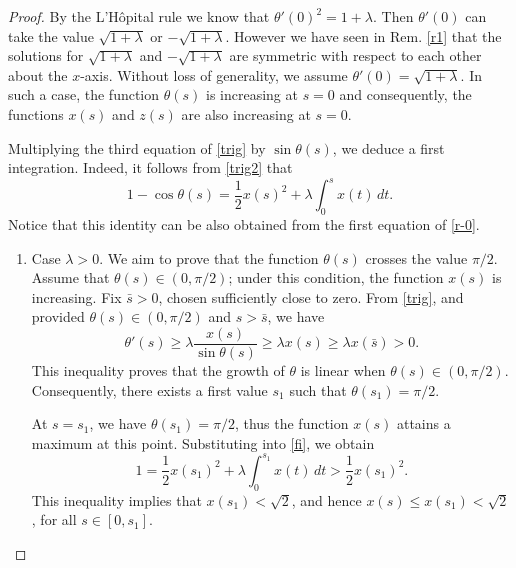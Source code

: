 \documentclass[12pt]{amsart}
\theoremstyle{definition}
\begin{document}
\begin{proof}
 

 By the L'H\^{o}pital rule we know that $\theta'(0)^2=1+\lambda$.  Then $\theta'(0)$ can take the value $\sqrt{1+\lambda}$ or $-\sqrt{1+\lambda}$. However we have seen in  Rem. \ref{r1} that the solutions for $\sqrt{1+\lambda}$ and $-\sqrt{1+\lambda}$ are symmetric with respect to each other about the $x$-axis.  Without loss of generality, we assume     $\theta'(0)=\sqrt{1+\lambda}$.  In such a case, the function $\theta(s)$ is increasing at $s=0$ and consequently, the functions $x(s)$ and $z(s)$ are also increasing at $s=0$.   

Multiplying the third equation of \eqref{trig} by $\sin\theta(s)$, we deduce a first integration. Indeed, it follows from \eqref{trig2} that
 \begin{equation}\label{fi}
1 -\cos\theta(s)=\frac12x(s)^2+\lambda\int_0^sx(t)\, dt.
\end{equation}
Notice that this identity can be also obtained from the first equation of \eqref{r-0}. 
\begin{enumerate}
\item Case $\lambda>0$.  We aim to prove that the function $\theta(s)$ crosses the value $\pi/2$. Assume that $\theta (s)\in (0,\pi/2)$; under this condition, the function $x(s)$ is increasing. Fix $\bar{s}>0$, chosen sufficiently close to zero. From \eqref{trig}, and provided $\theta(s)\in (0,\pi/2)$  and   $s>\bar{s}$, we have 
$$\theta'(s)\geq  \lambda\frac{x(s)}{\sin\theta(s)}\geq \lambda x(s) \geq\lambda x(\bar{s})>0.$$ This inequality proves that the growth of $\theta$ is linear when $\theta(s)\in (0,\pi/2)$. Consequently, there exists a first value $s_1$ such that $\theta(s_1)=\pi/2$. 

At $s=s_1$, we have $\theta(s_1)=\pi/2$, thus the function $x(s)$ attains a maximum at this point. Substituting into \eqref{fi}, we obtain
$$1=\frac12x(s_1)^2+\lambda\int_0^{s_1}x(t)\, dt>\frac12x(s_1)^2.$$
This inequality implies that $x(s_1)<\sqrt{2}$, and hence $x(s)\leq x(s_1)<\sqrt{2}$, for all $s\in [0,s_1]$.


\end{enumerate}
\end{proof}
\end{document}
